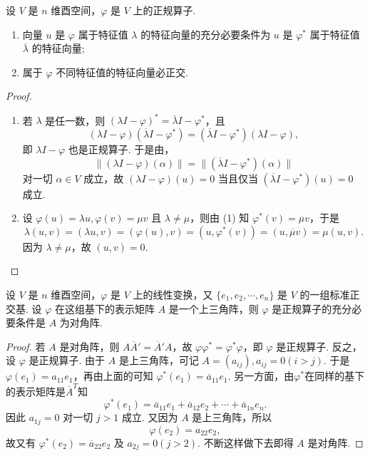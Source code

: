 \documentclass[../../main.tex]{subfiles}%
\begin{document}
\begin{proposition}\label{proposition:正规算子的特征值与特征向量的相关性质-例9.28}
设 $V$ 是 $n$ 维酉空间，$\varphi$ 是 $V$ 上的正规算子.
\begin{enumerate}[(1)]
\item 向量 $u$ 是 $\varphi$ 属于特征值 $\lambda$ 的特征向量的充分必要条件为 $u$ 是 $\varphi^*$ 属于特征值 $\overline{\lambda}$ 的特征向量;

\item 属于 $\varphi$ 不同特征值的特征向量必正交.
\end{enumerate}
\end{proposition}
\begin{proof}
\begin{enumerate}[(1)]
\item 若 $\lambda$ 是任一数，则 $(\lambda I - \varphi)^* = \overline{\lambda}I - \varphi^*$，且
\[
(\lambda I - \varphi)(\overline{\lambda}I - \varphi^*) = (\overline{\lambda}I - \varphi^*)(\lambda I - \varphi),
\]
即 $\lambda I - \varphi$ 也是正规算子. 于是由，
\[
\|(\lambda I - \varphi)(\alpha)\| = \|(\overline{\lambda}I - \varphi^*)(\alpha)\|
\]
对一切 $\alpha \in V$ 成立，故 $(\lambda I - \varphi)(u) = 0$ 当且仅当 $(\overline{\lambda}I - \varphi^*)(u) = 0$ 成立.

\item 设 $\varphi(u) = \lambda u, \varphi(v) = \mu v$ 且 $\lambda \neq \mu$，则由 (1) 知 $\varphi^*(v) = \overline{\mu}v$，于是
\[
\lambda(u,v) = (\lambda u,v) = (\varphi(u),v) = (u,\varphi^*(v)) = (u,\overline{\mu}v) = \mu(u,v).
\]
因为 $\lambda \neq \mu$，故 $(u,v) = 0$. 
\end{enumerate}
\end{proof}

\begin{lemma}\label{lemma:表示矩阵是上三角阵的正规算子表示矩阵必是对角阵}
设 $V$ 是 $n$ 维酉空间，$\varphi$ 是 $V$ 上的线性变换，又 $\{e_1,e_2,\cdots,e_n\}$ 是 $V$ 的一组标准正交基. 设 $\varphi$ 在这组基下的表示矩阵 $A$ 是一个上三角阵，则 $\varphi$ 是正规算子的充分必要条件是 $A$ 为对角阵.
\end{lemma}
\begin{proof}
若 $A$ 是对角阵，则 $A\overline{A}' = \overline{A}'A$，故 $\varphi\varphi^* = \varphi^*\varphi$，即 $\varphi$ 是正规算子. 反之，设 $\varphi$ 是正规算子. 由于 $A$ 是上三角阵，可记 $A = (a_{ij}), a_{ij} = 0 (i > j)$. 于是 $\varphi(e_1) = a_{11}e_1$，再由上面的可知 $\varphi^*(e_1) = \overline{a}_{11}e_1$. 另一方面，由$\varphi^*$在同样的基下的表示矩阵是$\overline{A}^T$知
\[
\varphi^*(e_1) = \overline{a}_{11}e_1 + \overline{a}_{12}e_2 + \cdots + \overline{a}_{1n}e_n.
\]
因此 $a_{1j} = 0$ 对一切 $j > 1$ 成立. 又因为 $A$ 是上三角阵，所以
\[
\varphi(e_2) = a_{22}e_2,
\]
故又有 $\varphi^*(e_2) = \overline{a}_{22}e_2$ 及 $a_{2j} = 0 (j > 2)$. 不断这样做下去即得 $A$ 是对角阵.
\end{proof}
\end{document}
